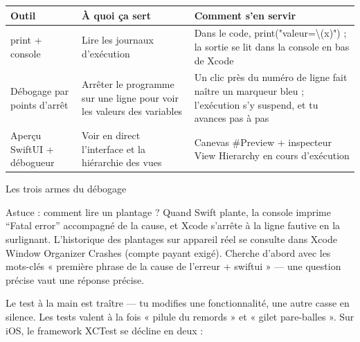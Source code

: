 


\begin{center}
\begin{tabularx}{\linewidth}{|X|X|X|}
\hline
\textbf{Outil} & \textbf{À quoi ça sert} & \textbf{Comment s'en servir} \tabularnewline
\hline
print + console & Lire les journaux d'exécution & Dans le code, print("valeur=\textbackslash{}(x)") ; la sortie se lit dans la console en bas de Xcode \tabularnewline
Débogage par points d'arrêt & Arrêter le programme sur une ligne pour voir les valeurs des variables & Un clic près du numéro de ligne fait naître un marqueur bleu ; l'exécution s'y suspend, et tu avances pas à pas \tabularnewline
Aperçu SwiftUI + débogueur & Voir en direct l'interface et la hiérarchie des vues & Canevas \#Preview + inspecteur View Hierarchy en cours d'exécution \tabularnewline
\hline
\end{tabularx}
\end{center}

\begin{center}\small\color{gray}Les trois armes du débogage\end{center}

\begin{tcbinfo}{Astuce : comment lire un plantage ?}
Quand Swift plante, la console imprime “Fatal error” accompagné de la cause, et Xcode s'arrête à la ligne fautive en la surlignant. L'historique des plantages sur appareil réel se consulte dans Xcode Window Organizer Crashes (compte payant exigé). Cherche d'abord avec les mots-clés « première phrase de la cause de l'erreur + swiftui » — une question précise vaut une réponse précise.

\end{tcbinfo}


Le test à la main est traître — tu modifies une fonctionnalité, une autre casse en silence. Les tests valent à la fois « pilule du remords » et « gilet pare-balles ». Sur iOS, le framework XCTest se décline en deux :

